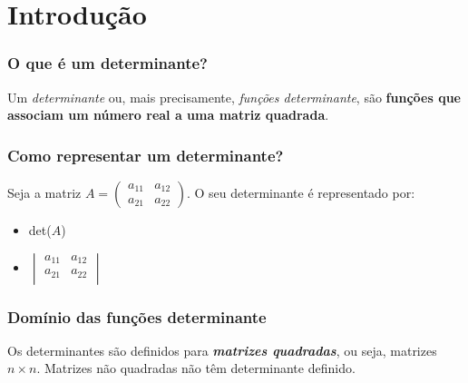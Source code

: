 \documentclass[pdftex, brazil]{beamer}
\begin{document}
\section{Introdução}

\begin{frame}[t]
  \frametitle{O que é um determinante?}
  Um \emph{determinante} ou, mais precisamente, \emph{funções determinante}, são
  \textbf{funções que associam um número real a uma matriz quadrada}.
\end{frame}

\begin{frame}[t]
  \frametitle{Como representar um determinante?}
  Seja a matriz $A = \begin{pmatrix}
a_{11} & a_{12}\\
a_{21} & a_{22}\end{pmatrix}$. O seu determinante é representado por:
  \vspace{1cm}
  \begin{itemize}
    \item det($A$)
    \item $\begin{vmatrix}
      a_{11} & a_{12}\\
      a_{21} & a_{22}\\
      \end{vmatrix}$
  \end{itemize}
\end{frame}

\begin{frame}[t]
  \frametitle{Domínio das funções determinante}
  Os determinantes são definidos para \emph{\textbf{matrizes quadradas}}, ou
  seja, matrizes $n \times n$. Matrizes não quadradas não têm determinante
  definido.
\end{frame}
\end{document}
